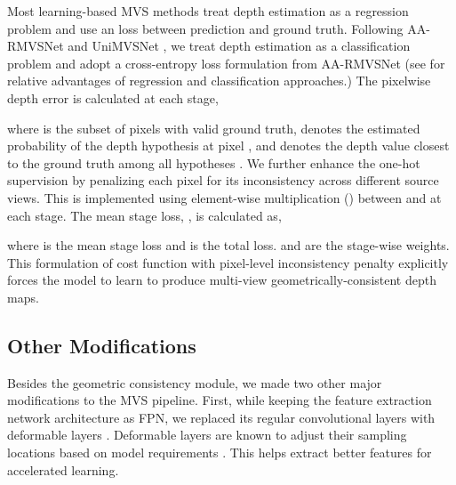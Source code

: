 \documentclass[10pt,twocolumn,letterpaper]{article}
\begin{document}
Most learning-based MVS methods \cite{gu2019casmvsnet, yang2019CVPMVS,Zhang2020visibility} 
treat depth estimation as a regression problem and use an  loss between prediction and ground truth. Following AA-RMVSNet \cite{wei2021aa} and UniMVSNet \cite{peng2022rethinkingMVS}, we treat depth 
estimation as a classification problem and adopt a cross-entropy loss formulation 
from AA-RMVSNet \cite{wei2021aa} (see \cite{peng2022rethinkingMVS} for 
relative advantages of regression and classification approaches.) The pixelwise 
depth error  is calculated at each stage,

\vspace{-8pt}

\vspace{-5pt}

\noindent where  is the subset of pixels with valid ground
truth,  denotes the estimated probability of the
depth hypothesis  at pixel , and  denotes the depth
value closest to the ground truth among all hypotheses \cite{ding2022transmvsnet}. We further
enhance the one-hot supervision by penalizing each pixel for its
inconsistency across different source views. This is implemented using
element-wise multiplication () between  and  at
each stage. The mean stage loss, , is calculated as,


\vspace{-14pt}

\vspace{-10pt}

\noindent where  is the mean stage loss and  is the total loss. 
 and  are the stage-wise weights.
This formulation of cost function
with pixel-level inconsistency penalty explicitly forces the model to learn to produce multi-view geometrically-consistent depth maps.




\subsection{Other Modifications}\label{sec:other-modification}

Besides the geometric consistency module, we made two other major modifications to the MVS pipeline.
First, while keeping the feature
extraction network architecture as FPN, we
replaced its regular convolutional layers with deformable layers
\cite{Dai2017deformableCNN, zhu2018deformableV2}. Deformable layers
are known to adjust their sampling locations based on model
requirements \cite{Dai2017deformableCNN, zhu2018deformableV2}. This
helps extract better features for accelerated learning.
\end{document}
